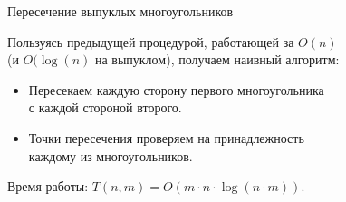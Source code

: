     \begin{frame}{Пересечение выпуклых многоугольников}

        Пользуясь предыдущей процедурой, работающей за $O(n)$ \\ (и $O(\log(n)$ на выпуклом), получаем наивный алгоритм:

        \begin{itemize}

            \item Пересекаем каждую сторону первого многоугольника \\ с каждой стороной второго.

            \item Точки пересечения проверяем на принадлежность \\ каждому из многоугольников.

        \end{itemize}

        Время работы: $T(n, m) = O(m \cdot n \cdot \log(n \cdot m))$.

    \end{frame}

